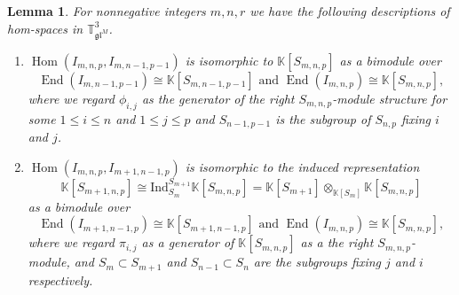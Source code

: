 \documentclass[11pt]{article}
\theoremstyle{plain}
\newtheorem{lemma}{Lemma}[section]
\theoremstyle{nonumberplain}
\theoremstyle{plain}
\theoremstyle{nonumberplain}
\newcommand\bK{{\mathbb K}}
\newcommand\bT{{\mathbb T}}
\newcommand\fgl{\mathfrak{gl}}
\DeclareMathOperator{\End}{\mathrm{End}}
\DeclareMathOperator{\Hom}{\mathrm{Hom}}
\begin{document}
\begin{lemma}\label{le.1}
For nonnegative integers $m,n,r$ we have the following descriptions of hom-spaces in $\bT^3_{\fgl^M}$. 
\begin{enumerate}
\renewcommand{\labelenumi}{(\alph{enumi})}
\item $\Hom(I_{m,n,p},I_{m,n-1,p-1})$ is isomorphic to $\bK[S_{m,n,p}]$ as a bimodule over 
  \begin{equation*}
    \End(I_{m,n-1,p-1})\cong \bK[S_{m,n-1,p-1}] \text{ and } \End(I_{m,n,p})\cong\bK[S_{m,n,p}],   
  \end{equation*}
where we regard $\phi_{i,j}$ as the generator of the right $S_{m,n,p}$-module structure for some $1\le i\le n$ and $1\le j\le p$ and $S_{n-1,p-1}$ is the subgroup of $S_{n,p}$ fixing $i$ and $j$. 
\item $\Hom(I_{m,n,p},I_{m+1,n-1,p})$ is isomorphic to the induced representation 
  \begin{equation*}
    \bK[S_{m+1,n,p}]\cong \mathrm{Ind}_{S_m}^{S_{m+1}}\bK[S_{m,n,p}]=\bK[S_{m+1}]\otimes_{\bK[S_m]}\bK[S_{m,n,p}]
  \end{equation*}
as a bimodule over
  \begin{equation*}
    \End(I_{m+1,n-1,p})\cong \bK[S_{m+1,n-1,p}] \text{ and } \End(I_{m,n,p})\cong\bK[S_{m,n,p}],   
  \end{equation*}
where we regard $\pi_{i,j}$ as a generator of $\bK[S_{m,n,p}]$ as a the right $S_{m,n,p}$-module, and $S_m\subset S_{m+1}$ and $S_{n-1}\subset S_n$ are the subgroups fixing $j$ and $i$ respectively.  
\end{enumerate} 
\end{lemma}
\end{document}
